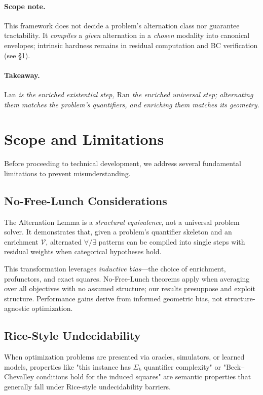 \documentclass[11pt]{article}
\numberwithin{equation}{section}
\theoremstyle{upright}
\newcommand{\V}{\mathcal{V}}
\newcommand{\Lan}{\mathrm{Lan}}
\newcommand{\Ran}{\mathrm{Ran}}
\begin{document}
\paragraph{Scope note.}
This framework does not decide a problem's alternation class nor guarantee tractability. It \emph{compiles} a \emph{given} alternation in a \emph{chosen} modality into canonical envelopes; intrinsic hardness remains in residual computation and BC verification (see \S\ref{sec:scope-limitations}).

\paragraph{Takeaway.}
\emph{$\Lan$ is the enriched existential step, $\Ran$ the enriched universal step; alternating them matches the problem's quantifiers, and enriching them matches its geometry.}

\section{Scope and Limitations}\label{sec:scope-limitations}

Before proceeding to technical development, we address several fundamental limitations to prevent misunderstanding.

\subsection{No-Free-Lunch Considerations}

The Alternation Lemma is a \emph{structural equivalence}, not a universal problem solver. It demonstrates that, given a problem's quantifier skeleton and an enrichment $\V$, alternated $\forall/\exists$ patterns can be compiled into single steps with residual weights when categorical hypotheses hold.

This transformation leverages \emph{inductive bias}—the choice of enrichment, profunctors, and exact squares. No-Free-Lunch theorems apply when averaging over all objectives with no assumed structure; our results presuppose and exploit structure. Performance gains derive from informed geometric bias, not structure-agnostic optimization.

\subsection{Rice-Style Undecidability}

When optimization problems are presented via oracles, simulators, or learned models, properties like "this instance has $\Sigma_k$ quantifier complexity" or "Beck--Chevalley conditions hold for the induced squares" are semantic properties that generally fall under Rice-style undecidability barriers.
\end{document}
